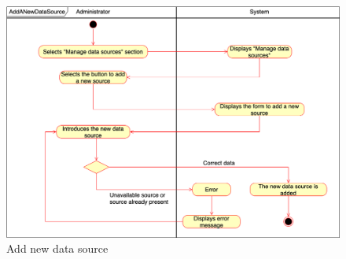     \begin{figure}[h!]
        \centering
        \includegraphics[scale=0.35]{images/use_cases_diagram/administrator_add_datasource.png}
        \caption{Add new data source}
        \label{fig:administrator_add_datasource}
    \end{figure}
   \FloatBarrier 
   
